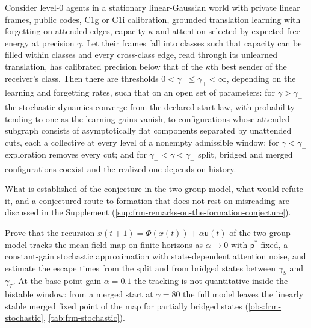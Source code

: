 \begin{conjecture}\label{conj:frm-formation}
Consider level-0 agents in a stationary linear-Gaussian world with private linear frames, public codes, C1g or C1i calibration, grounded translation learning with forgetting on attended edges, capacity $\kappa$ and attention selected by expected free energy at precision $\gamma$. Let their frames fall into classes such that capacity can be filled within classes and every cross-class edge, read through its unlearned translation, has calibrated precision below that of the $\kappa$th best sender of the receiver's class. Then there are thresholds $0<\gamma_-\le\gamma_+<\infty$, depending on the learning and forgetting rates, such that on an open set of parameters: for $\gamma>\gamma_+$ the stochastic dynamics converge from the declared start law, with probability tending to one as the learning gains vanish, to configurations whose attended subgraph consists of asymptotically flat components separated by unattended cuts, each a collective at every level of a nonempty admissible window; for $\gamma<\gamma_-$ exploration removes every cut; and for $\gamma_-<\gamma<\gamma_+$ split, bridged and merged configurations coexist and the realized one depends on history.
\end{conjecture}
What is established of the conjecture in the two-group model, what would refute it, and a conjectured route to formation that does not rest on misreading are discussed in the Supplement (\cref{sup:frm-remarks-on-the-formation-conjecture}).

\begin{openproblem}\label{open:frm-closure}
Prove that the recursion $x(t+1)=\Phi(x(t))+\alpha\mathsf u(t)$ of the two-group model tracks the mean-field map on finite horizons as $\alpha\to0$ with $\mathsf p^\ast$ fixed, a constant-gain stochastic approximation with state-dependent attention noise, and estimate the escape times from the split and from bridged states between $\gamma_S$ and $\gamma_T$. At the base-point gain $\alpha=0.1$ the tracking is not quantitative inside the bistable window: from a merged start at $\gamma=80$ the full model leaves the linearly stable merged fixed point of the map for partially bridged states (\cref{obs:frm-stochastic}, \cref{tab:frm-stochastic}).
\end{openproblem}

